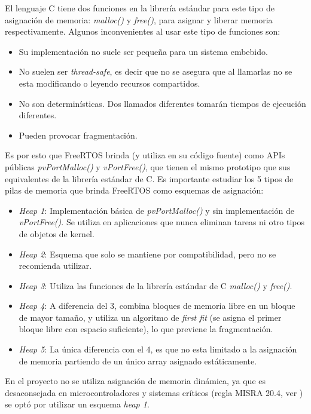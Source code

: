 \documentclass{IEEEtran}
\begin{document}
El lenguaje C tiene dos funciones en la librería estándar para este tipo de asignación de memoria: \textit{malloc()} y \textit{free()}, para asignar y liberar memoria respectivamente. Algunos inconvenientes al usar este tipo de funciones son:

\begin{itemize}
    \item Su implementación no suele ser pequeña para un sistema embebido.
    \item No suelen ser \textit{thread-safe}, es decir que no se asegura que al llamarlas no se esta modificando o leyendo recursos compartidos.
    \item No son determinísticas. Dos llamados diferentes tomarán tiempos de ejecución diferentes.
    \item Pueden provocar fragmentación.
\end{itemize}

Es por esto que FreeRTOS brinda (y utiliza en su código fuente) como APIs públicas \textit{pvPortMalloc()} y \textit{vPortFree()}, que tienen el mismo prototipo que sus equivalentes de la librería estándar de C. Es importante estudiar los 5 tipos de pilas de memoria que brinda FreeRTOS como esquemas de asignación:

\begin{itemize}
    \item \textit{Heap 1}: Implementación básica de \textit{pvPortMalloc()} y sin implementación de \textit{vPortFree()}. Se utiliza en aplicaciones que nunca eliminan tareas ni otro tipos de objetos de kernel.
    \item \textit{Heap 2}: Esquema que solo se mantiene por compatibilidad, pero no se recomienda utilizar.
    \item \textit{Heap 3}: Utiliza las funciones de la librería estándar de C \textit{malloc()} y \textit{free()}.
    \item \textit{Heap 4}: A diferencia del 3, combina bloques de memoria libre en un bloque de mayor tamaño, y utiliza un algoritmo de \textit{first fit} (se asigna el primer bloque libre con espacio suficiente), lo que previene la fragmentación.
    \item \textit{Heap 5}: La única diferencia con el 4, es que no esta limitado a la asignación de memoria partiendo de un único array asignado estáticamente.
\end{itemize}

En el proyecto no se utiliza asignación de memoria dinámica, ya que es desaconsejada en microcontroladores y sistemas críticos (regla MISRA 20.4, ver \textcite{misra-c}) se optó por utilizar un esquema \textit{heap 1}.
\end{document}
